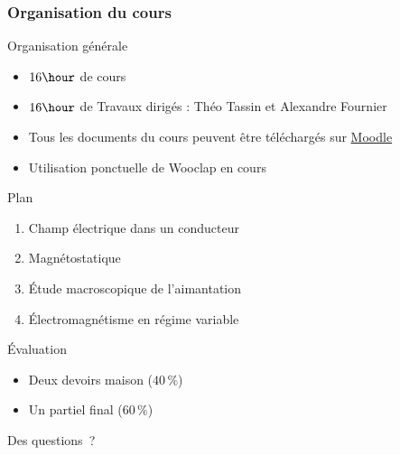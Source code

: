 \documentclass[9pt, dvipsnames,aspectratio=169]{beamer}
\begin{document}
\begin{frame}
	\frametitle{Organisation du cours}
	\begin{alertblock}{Organisation générale}
	\begin{itemize}
		\item $16 \hour$ de cours 
		\item $16 \hour$ de Travaux dirigés : Théo Tassin et Alexandre Fournier
		\item Tous les documents du cours peuvent être téléchargés sur 
		  \href{https://moodle.u-paris.fr/}{Moodle}
		\item Utilisation ponctuelle de Wooclap en cours
	\end{itemize}
	\end{alertblock}
	\vfill
	\begin{alertblock}{Plan}
	\begin{enumerate}
		\item Champ électrique dans un conducteur
		\item Magnétostatique
		\item Étude macroscopique de l'aimantation
		\item Électromagnétisme en régime variable
	\end{enumerate}
	\end{alertblock}
	\vfill
	\begin{alertblock}{Évaluation}
	\begin{itemize}
		\item Deux devoirs maison ($40\,\%$)
		\item Un partiel final ($60\,\%$)
	\end{itemize}
	\end{alertblock}
\end{frame}

\begin{frame}[standout]
	Des questions~?
\end{frame}
\end{document}

